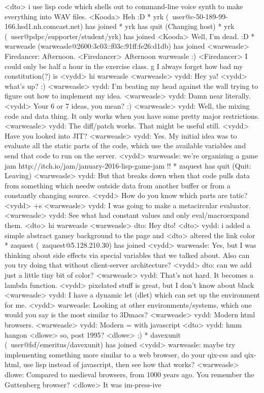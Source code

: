 \documentclass[a4paper,11pt]{article}
\begin{document}
<dto> i use lisp code which shells out to command-line voice synth to make everything into WAV files.
<Kooda> Heh :D
* yrk (~user@c-50-189-99-166.hsd1.nh.comcast.net) has joined
* yrk has quit (Changing host)
* yrk (~user@pdpc/supporter/student/yrk) has joined
<Kooda> Well, I’m dead. :D
* warweasle (warweasle@2600:3c03::f03c:91ff:fe26:d1db) has joined
<warweasle> Firedancer: Afternoon.
<Firedancer> Afternoon warweasle :)
<Firedancer> I could only be half a hour in the exercise class. ^^' I always forget how bad my constitution(?) is
<vydd> hi warweasle
<warweasle> vydd: Hey ya!
<vydd> what's up? :)
<warweasle> vydd: I'm beating my head against the wall trying to figure out how to implement my idea.
<warweasle> vydd: Damn near literally.
<vydd> Your 6 or 7 ideas, you mean? :)
<warweasle> vydd: Well, the mixing code and data thing. It only works when you have some pretty major restrictions.
<warweasle> vydd: The diff/patch works. That might be useful still.
<vydd> Have you looked into JIT?
<warweasle> vydd: Yes. My initial idea was to evaluate all the static parts of the code, which use the available variables and send that code to run on the server.
<vydd> warweasle: we're organizing a game jam http://itch.io/jam/january-2016-lisp-game-jam !!
* zaquest has quit (Quit: Leaving)
<warweasle> vydd: But that breaks down when that code pulls data from something which needw outside data from another buffer or from a constantly changing source.
<vydd> How do you know which parts are tatic?
<vydd> +s
<warweasle> vydd: I was going to make a metacircular evaluator.
<warweasle> vydd: See what had constant values and only eval/macroexpand them.
<dto> hi warweasle
<warweasle> dto: Hey dto!
<dto> vydd: i added a simple abstract gamey background to the page and
<dto> altered the link color
* zaquest (~zaquest@5.128.210.30) has joined
<vydd> warweasle: Yes, but I was thinking about side effects via special variables that we talked about. Also can you try doing that without client-server architecture?
<vydd> dto: can we add just a little tiny bit of color?
<warweasle> vydd: That's not hard. It becomes a lambda function.
<vydd> pixelated stuff is great, but I don't know about black
<warweasle> vydd: I have a dynamic let (dlet) which can set up the environment for me.
<vydd> warweasle: Looking at other environments/systems, which one would you say is the most similar to 3Dmacs?
<warweasle> vydd: Modern html browsers.
<warweasle> vydd: Modern = with javascript
<dto> vydd: hmm hangon
<dlowe> so, post 1995?
<dlowe> ;)
* davexunit (~user@fsf/emeritus/davexunit) has joined
<vydd> warweasle: maybe try implementing something more similar to a web browser, do your qix-css and qix-html, use lisp instead of javascript, then see how that works?
<warweasle> dlowe: Compared to medieval browsers, from 1000 years ago. You remember the Guttenberg browser?
<dlowe> It was im-press-ive
\end{document}
